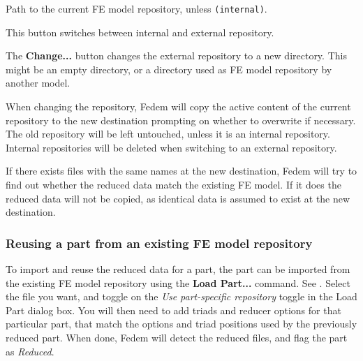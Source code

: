 \begin{bulletlist}
\item Path to the current FE model repository, unless {\tt(internal)}.
\item This button switches between internal and external repository.
\item The \textbf{Change...} button
  changes the external repository to a new directory.
  This might be an empty directory, or a directory used as FE model repository
  by another model.
\end{bulletlist}

When changing the repository, Fedem will copy the active content of the
current repository to the new destination prompting on whether to
overwrite if necessary. The old repository will be left untouched,
unless it is an internal repository. Internal repositories will be
deleted when switching to an external repository.

If there exists files with the same names at the new destination, Fedem
will try to find out whether the reduced data match the existing FE model.
If it does the reduced data will not be copied, as identical data is assumed to
exist at the new destination.


\subsubsection{Reusing a part from an existing FE model repository}

To import and reuse the reduced data for a part, the part can be imported from
the existing FE model repository using the \textbf{Load Part...} command.
See .
Select the  file you want, and toggle on the
{\sl Use part-specific repository} toggle in the Load Part dialog box.
You will then need to add triads and reducer options for that particular part,
that match the options and triad positions used by the previously reduced part.
When done, Fedem will detect the reduced files,
and flag the part as {\sl Reduced}.
